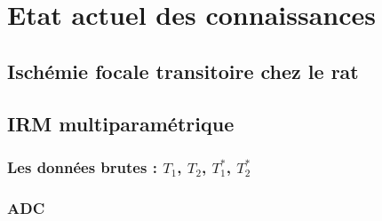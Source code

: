 \section{Etat actuel des connaissances}

\subsection{Isch\'emie focale transitoire chez le rat}


\subsection{IRM multiparam\'etrique}


\setcounter{subsubsection}{-1}
\subsubsection{Les donn\'ees brutes : $T_1$, $T_2$, $T^{\ast}_1$, $T^{\ast}_2$}




\subsubsection{ADC}